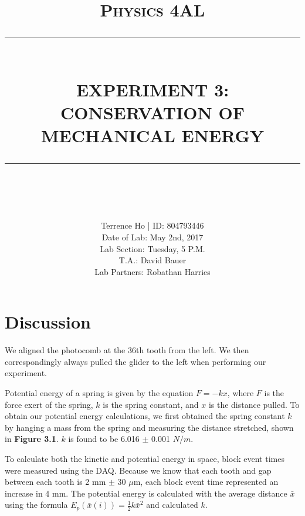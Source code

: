 \documentclass[11pt]{report}
\newcommand{\HRule}[1]{\rule{\linewidth}{#1}}
\begin{document}
\title{ \normalsize \textsc{Physics 4AL}
        \\ [2.0cm]
        \HRule{0.5pt} \\
        \LARGE \textbf{\uppercase{Experiment 3: Conservation of Mechanical Energy}}
        \HRule{2pt} \\ [0.5cm]
        \vspace*{2\baselineskip}}

\date{}

\author{
        Terrence Ho | ID: 804793446 \\ 
        Date of Lab: May 2nd, 2017 \\
        Lab Section: Tuesday, 5 P.M.\\
        T.A.: David Bauer\\
        Lab Partners: Robathan Harries}

\maketitle
\tableofcontents
\newpage

\sectionfont{\scshape}


\section*{Discussion}

We aligned the photocomb at the 36th tooth from the left.  We then
correspondingly always pulled the glider to the left when performing our
experiment.  

Potential energy of a spring is given by the equation \(F = -kx\), where \(F\) is the force
exert of the spring, \(k\) is the spring constant, and \(x\) is the distance pulled. 
To obtain our potential energy calculations, we first obtained the spring constant 
\(k\) by hanging a mass from the spring and measuring the distance stretched,
shown in \textbf{Figure 3.1}.  \(k\) is found to be 6.016 $\pm$ 0.001 \(N/m\).

To calculate both the kinetic and potential energy in space, block event times
were measured using the DAQ.  Because we know that each tooth and gap between
each tooth is 2 mm $\pm$ 30 $\mu$m, each block event time represented an
increase in 4 mm.  The potential energy is calculated with the average distance
$\bar{x}$ using the formula \(E_p(\bar{x}(i)) = \frac{1}{2}k\bar{x}^2\) and 
calculated \(k\).  
\end{document}
